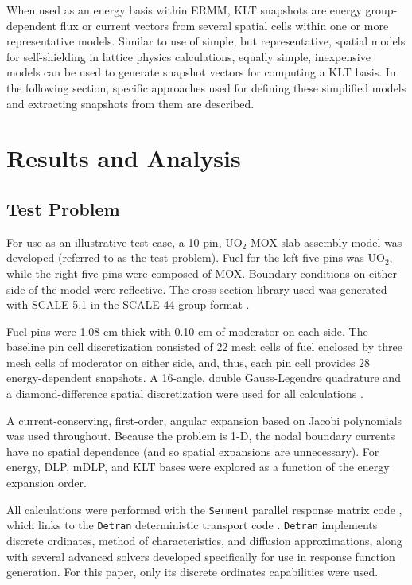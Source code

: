 \documentclass{anstrans}
\begin{document}
When used as an energy basis within ERMM, KLT snapshots are energy group-
dependent flux or current vectors from several spatial cells within one or more
representative models.  Similar to use of simple, but representative, spatial
models for self-shielding in lattice physics calculations, equally simple,
inexpensive models can be used to generate snapshot vectors for computing a KLT
basis.  In the following section, specific approaches used for defining these
simplified models and extracting snapshots from them are described.

\section{Results and Analysis}

\subsection{Test Problem}

For use as an illustrative test case, a 10-pin, UO$_2$-MOX slab assembly model
was developed (referred to as the test problem). Fuel for the left five pins was
UO$_2$, while the right five pins were composed of MOX. Boundary conditions on
either side of the model were reflective. The cross section library used was
generated with SCALE 5.1 in the SCALE 44-group format \cite{Scale}.

Fuel pins were 1.08 cm thick with 0.10 cm of moderator on each side. The
baseline pin cell discretization consisted of 22 mesh cells of fuel enclosed by
three mesh cells of moderator on either side, and, thus, each pin cell provides
28 energy-dependent snapshots. A 16-angle, double Gauss-Legendre quadrature and
a diamond-difference spatial discretization were used for all calculations
\cite{Roberts2014}.

A current-conserving, first-order, angular expansion based on Jacobi polynomials
 \cite{Roberts2014} was used throughout.  Because the problem is 1-D, the nodal
boundary currents have no spatial dependence (and so spatial expansions are
unnecessary). For energy, DLP, mDLP, and KLT bases were explored as a function
of the energy expansion order.

All calculations were performed with the {\tt Serment} parallel response matrix
code \cite{RobertsSerment}, which links to the {\tt Detran} deterministic
transport code \cite{RobertsDetran}. {\tt Detran} implements discrete ordinates,
method of characteristics, and diffusion approximations, along with several
advanced solvers developed specifically for use in response function generation.
For this paper, only its discrete ordinates capabilities were used.
\end{document}
